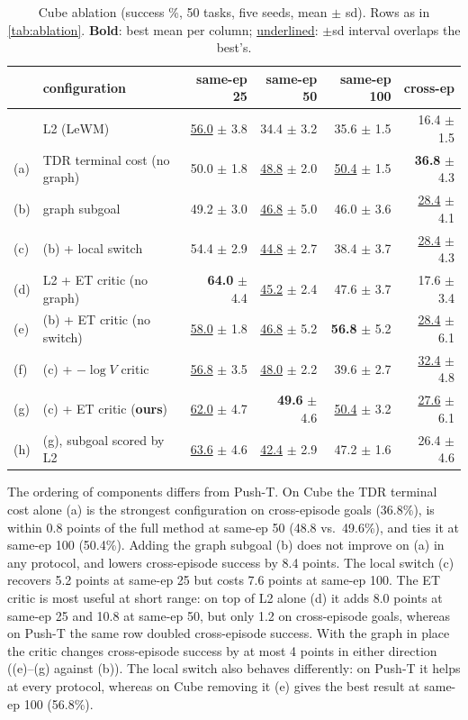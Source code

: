 \documentclass{article} %
\theoremstyle{definition}
\theoremstyle{remark}
\begin{document}
\begin{table}[h]
\centering\small
\caption{Cube ablation (success \%, 50 tasks, five seeds, mean $\pm$ sd). Rows as in
\cref{tab:ablation}. \textbf{Bold}: best mean per column; \underline{underlined}: $\pm$sd
interval overlaps the best's.}
\label{tab:ablation-cube}
\begin{tabular}{llrrrr}
\toprule
& configuration & same-ep 25 & same-ep 50 & same-ep 100 & cross-ep \\
\midrule
& L2 (LeWM) & \underline{56.0} $\pm$ 3.8 & 34.4 $\pm$ 3.2 & 35.6 $\pm$ 1.5 & 16.4 $\pm$ 1.5 \\
(a) & TDR terminal cost (no graph) & 50.0 $\pm$ 1.8 & \underline{48.8} $\pm$ 2.0 & \underline{50.4} $\pm$ 1.5 & \textbf{36.8} $\pm$ 4.3 \\
(b) & graph subgoal & 49.2 $\pm$ 3.0 & \underline{46.8} $\pm$ 5.0 & 46.0 $\pm$ 3.6 & \underline{28.4} $\pm$ 4.1 \\
(c) & (b) + local switch & 54.4 $\pm$ 2.9 & \underline{44.8} $\pm$ 2.7 & 38.4 $\pm$ 3.7 & \underline{28.4} $\pm$ 4.3 \\
\midrule
(d) & L2 + ET critic (no graph) & \textbf{64.0} $\pm$ 4.4 & \underline{45.2} $\pm$ 2.4 & 47.6 $\pm$ 3.7 & 17.6 $\pm$ 3.4 \\
(e) & (b) + ET critic (no switch) & \underline{58.0} $\pm$ 1.8 & \underline{46.8} $\pm$ 5.2 & \textbf{56.8} $\pm$ 5.2 & \underline{28.4} $\pm$ 6.1 \\
(f) & (c) + $-\log V$ critic & \underline{56.8} $\pm$ 3.5 & \underline{48.0} $\pm$ 2.2 & 39.6 $\pm$ 2.7 & \underline{32.4} $\pm$ 4.8 \\
(g) & (c) + ET critic (\textbf{ours}) & \underline{62.0} $\pm$ 4.7 & \textbf{49.6} $\pm$ 4.6 & \underline{50.4} $\pm$ 3.2 & \underline{27.6} $\pm$ 6.1 \\
(h) & (g), subgoal scored by L2 & \underline{63.6} $\pm$ 4.6 & \underline{42.4} $\pm$ 2.9 & 47.2 $\pm$ 1.6 & 26.4 $\pm$ 4.6 \\
\bottomrule
\end{tabular}
\end{table}

The ordering of components differs from Push-T. On Cube the TDR terminal cost alone (a) is the
strongest configuration on cross-episode goals (36.8\%), is within 0.8 points of the full method
at same-ep 50 (48.8 vs.\ 49.6\%), and ties it at same-ep 100 (50.4\%). Adding the graph subgoal (b) does not improve on (a) in any
protocol, and lowers cross-episode success by 8.4 points. The local switch (c) recovers 5.2 points
at same-ep 25 but costs 7.6 points at same-ep 100. The ET critic is most useful at short range:
on top of L2 alone (d) it adds 8.0 points at same-ep 25 and 10.8 at same-ep 50, but only 1.2 on
cross-episode goals, whereas on Push-T the same row doubled cross-episode success. With the
graph in place the critic changes cross-episode success by at most 4 points in either
direction ((e)--(g) against (b)). The local switch also behaves differently: on Push-T it helps at every protocol, whereas on
Cube removing it (e) gives the best result at same-ep 100 (56.8\%).
\end{document}
